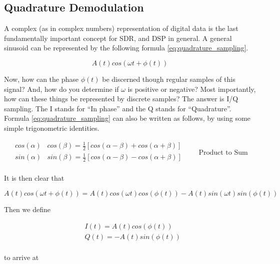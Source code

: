 \documentclass[a4paper, 12pt]{article}
\begin{document}
\subsection{Quadrature Demodulation}
\label{sec:quadrature_sampling}
A complex (as in complex numbers) representation of digital data is the last fundamentally important concept for SDR, and DSP in general.  A general sinusoid can be represented by the following formula \ref{eq:quadrature_sampling}.

\begin{equation}
\label{eq:quadrature_sampling}
A(t)cos(\omega t + \phi (t))
\end{equation}

Now, how can the phase $\phi(t)$ be discerned though regular samples of this signal?  And, how do you determine if $\omega$ is positive or negative?  Most importantly, how can these things be represented by discrete samples?  The answer is I/Q sampling.  The I stands for ``In phase'' and the Q stands for ``Quadrature''.  Formula \ref{eq:quadrature_sampling} can also be written as follows, by using some simple trigonometric identities.

\begin{equation}
\label{eq:trig_ident}
\begin{aligned}
  cos(\alpha)&cos(\beta) = \frac{1}{2}[cos(\alpha - \beta) + cos(\alpha + \beta)]\\
  sin(\alpha)&sin(\beta) = \frac{1}{2}[cos(\alpha - \beta) - cos(\alpha + \beta)]\\
\end{aligned}
\qquad \text{Product to Sum}
\end{equation}

It is then clear that

\begin{equation*} %
A(t)cos(\omega t + \phi (t)) = A(t)cos(\omega t)cos(\phi (t)) - 
A(t)sin(\omega t)sin(\phi(t))
\end{equation*}

Then we define

\begin{equation}
\label{eq:iq_defn}
\begin{aligned}
  &I(t) = A(t)cos(\phi (t))\\
  &Q(t) = -A(t)sin(\phi (t))\\
\end{aligned}
\end{equation}

to arrive at  
\end{document}
